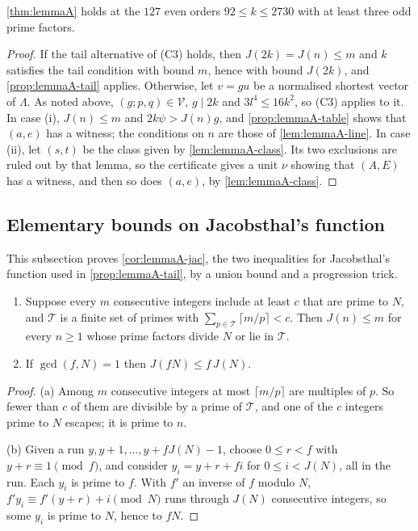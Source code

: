 \begin{proposition}
\label{prop:lemmaA-finite}
\autoref{thm:lemmaA} holds at the $127$ even orders $92\le k\le2730$ with at
least three odd prime factors.
\end{proposition}

\begin{proof}
If the tail alternative of (C3) holds, then $J(2k)=J(n)\le m$ and $k$
satisfies the tail condition with bound $m$, hence with bound $J(2k)$, and
\autoref{prop:lemmaA-tail} applies. Otherwise, let $v=gu$ be a normalised shortest vector of
$\Lambda$. As noted above, $(g;p,q)\in\mathcal V$, $g\mid2k$ and
$3l^4\le16k^2$, so (C3) applies to it. In case (i), $J(n)\le m$ and $2k\psi>J(n)g$, and
\autoref{prop:lemmaA-table} shows that $(a,e)$ has a witness; the conditions on $n$
are those of \autoref{lem:lemmaA-line}. In case (ii), let $(s,t)$ be the
class given by \autoref{lem:lemmaA-class}. Its two exclusions are ruled out
by that lemma, so the certificate gives a unit $\nu$ showing that $(A,E)$ has a
witness, and then so does $(a,e)$, by \autoref{lem:lemmaA-class}.
\end{proof}


\subsection{Elementary bounds on Jacobsthal's function}
\label{app:lemmaA-jacbounds}

This subsection proves \autoref{cor:lemmaA-jac}, the two inequalities for
Jacobsthal's function used in \autoref{prop:lemmaA-tail}, by a union bound and
a progression trick.

\begin{lemma}
\label{lem:lemmaA-jactools}
\begin{enumerate}
\item[(a)] Suppose every $m$ consecutive integers include at least $c$ that
are prime to $N$, and $\mathcal T$ is a finite set of primes with
$\sum_{p\in\mathcal T}\lceil m/p\rceil<c$. Then $J(n)\le m$ for every $n\ge1$
whose prime factors divide $N$ or lie in $\mathcal T$.
\item[(b)] If $\gcd(f,N)=1$ then $J(fN)\le f\,J(N)$.
\end{enumerate}
\end{lemma}

\begin{proof}
(a) Among $m$ consecutive integers at most $\lceil m/p\rceil$ are multiples
of $p$. So fewer than $c$ of them are divisible by a prime of $\mathcal T$,
and one of the $c$ integers prime to $N$ escapes; it is prime to $n$.

(b) Given a run $y,y+1,\dots,y+fJ(N)-1$, choose $0\le r<f$ with
$y+r\equiv1\pmod f$, and consider $y_i=y+r+fi$ for $0\le i<J(N)$, all in the
run. Each $y_i$ is prime to $f$. With $f'$ an inverse of $f$ modulo $N$,
$f'y_i\equiv f'(y+r)+i\pmod N$ runs through $J(N)$ consecutive integers, so
some $y_i$ is prime to $N$, hence to $fN$.
\end{proof}

